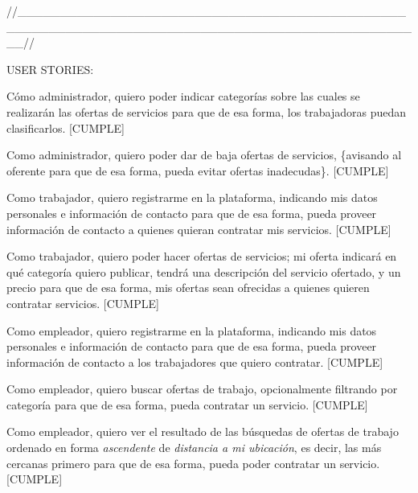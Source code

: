 //\+\_\+\+\_\+\+\_\+\+\_\+\+\_\+\+\_\+\+\_\+\+\_\+\+\_\+\+\_\+\+\_\+\+\_\+\+\_\+\+\_\+\+\_\+\+\_\+\+\_\+\+\_\+\+\_\+\+\_\+\+\_\+\+\_\+\+\_\+\+\_\+\+\_\+\+\_\+\+\_\+\+\_\+\+\_\+\+\_\+\+\_\+\+\_\+\+\_\+\+\_\+\+\_\+\+\_\+\+\_\+\+\_\+\+\_\+\+\_\+\+\_\+\+\_\+\+\_\+\+\_\+\+\_\+\+\_\+\+\_\+\+\_\+\+\_\+\+\_\+\+\_\+\+\_\+\+\_\+\+\_\+\+\_\+\+\_\+\+\_\+\+\_\+\+\_\+\+\_\+\+\_\+\+\_\+\+\_\+\+\_\+\+\_\+\+\_\+\+\_\+\+\_\+\+\_\+\+\_\+\+\_\+\+\_\+\+\_\+\+\_\+\+\_\+\+\_\+\+\_\+\+\_\+\+\_\+\+\_\+\+\_\+\+\_\+\+\_\+\+\_\+\+\_\+\+\_\+\+\_\+\+\_\+\+\_\+\+\_\+\+\_\+\+\_\+\+\_\+\+\_\+\+\_\+\+\_\+//


\begin{DoxyItemize}
\item USER STORIES\+:
\end{DoxyItemize}

Cómo administrador, quiero poder indicar categorías sobre las cuales se realizarán las ofertas de servicios para que de esa forma, los trabajadoras puedan clasificarlos. \mbox{[}CUMPLE\mbox{]}

Como administrador, quiero poder dar de baja ofertas de servicios, \{avisando al oferente para que de esa forma, pueda evitar ofertas inadecudas\}. \mbox{[}CUMPLE\mbox{]}

Como trabajador, quiero registrarme en la plataforma, indicando mis datos personales e información de contacto para que de esa forma, pueda proveer información de contacto a quienes quieran contratar mis servicios. \mbox{[}CUMPLE\mbox{]}

Como trabajador, quiero poder hacer ofertas de servicios; mi oferta indicará en qué categoría quiero publicar, tendrá una descripción del servicio ofertado, y un precio para que de esa forma, mis ofertas sean ofrecidas a quienes quieren contratar servicios. \mbox{[}CUMPLE\mbox{]}

Como empleador, quiero registrarme en la plataforma, indicando mis datos personales e información de contacto para que de esa forma, pueda proveer información de contacto a los trabajadores que quiero contratar. \mbox{[}CUMPLE\mbox{]}

Como empleador, quiero buscar ofertas de trabajo, opcionalmente filtrando por categoría para que de esa forma, pueda contratar un servicio. \mbox{[}CUMPLE\mbox{]}

Como empleador, quiero ver el resultado de las búsquedas de ofertas de trabajo ordenado en forma {\itshape ascendente} de {\itshape distancia a mi ubicación}, es decir, las más cercanas primero para que de esa forma, pueda poder contratar un servicio. \mbox{[}CUMPLE\mbox{]}

